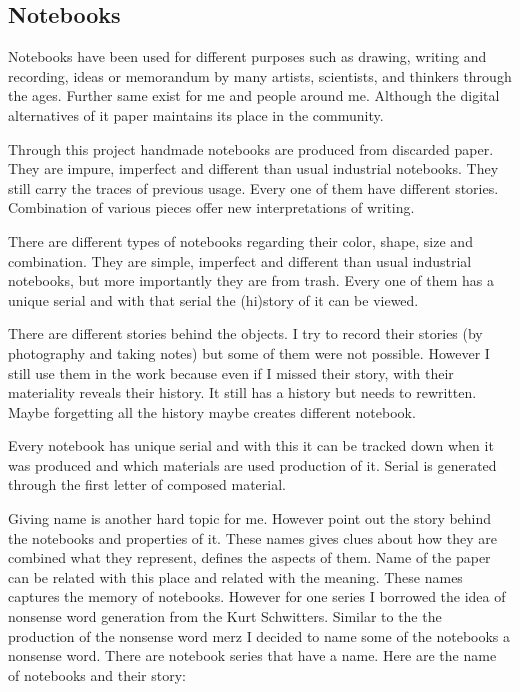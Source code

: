 %
%
\subsection{Notebooks}

Notebooks have been used for different purposes such as drawing, writing and recording, ideas or memorandum by many artists, scientists, and thinkers through the ages. Further same exist for me and people around me. Although the digital alternatives of it paper maintains its place in the community.

Through this project handmade notebooks are produced from discarded paper. They are impure, imperfect and different than usual industrial notebooks. They still carry the traces of previous usage. Every one of them have different stories. Combination of various pieces offer new interpretations of writing.

There are different types of notebooks regarding their color, shape, size and combination. They are simple, imperfect and different than usual industrial notebooks, but more importantly they are from trash. Every one of them has a unique serial and with that serial the (hi)story of it can be viewed.

There are different stories behind the objects. I try to record their stories (by photography and taking notes) but some of them were not possible. However I still use them in the work because even if I missed their story, with their materiality reveals their history. It still has a history but needs to rewritten. Maybe forgetting all the history maybe creates different notebook.

Every notebook has unique serial and with this it can be tracked down when it was produced and which materials are used production of it. Serial is generated through the first letter of composed material. 

Giving name is another hard topic for me. However point out the story behind the notebooks and properties of it. These names gives clues about how they are combined what they represent, defines the aspects of them. Name of the paper can be related with this place and related with the meaning. These names captures the memory of notebooks. However for one series I borrowed the idea of nonsense word generation from the Kurt Schwitters. Similar to the the production of the nonsense word merz I decided to name some of the notebooks a nonsense word. There are notebook series that have a name. Here are the name of notebooks and their story:

